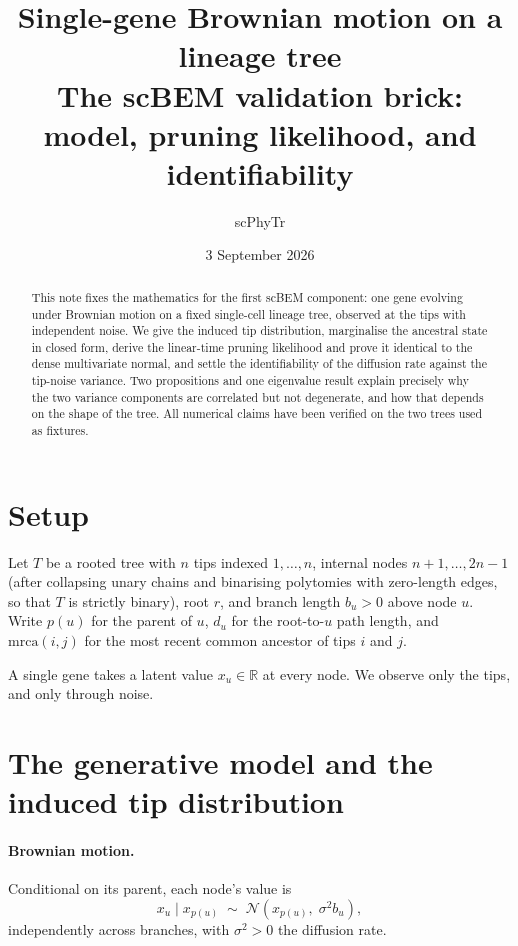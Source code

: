 \documentclass[11pt]{article}
\title{Single-gene Brownian motion on a lineage tree\\
\large The scBEM validation brick: model, pruning likelihood, and identifiability}
\author{scPhyTr}
\date{3 September 2026}
\theoremstyle{remark}
\newcommand{\Norm}{\mathcal{N}}
\newcommand{\Rb}{\mathbb{R}}
\begin{document}
\maketitle

\begin{abstract}
This note fixes the mathematics for the first scBEM component: one gene evolving under Brownian
motion on a fixed single-cell lineage tree, observed at the tips with independent noise. We give the
induced tip distribution, marginalise the ancestral state in closed form, derive the linear-time
pruning likelihood and prove it identical to the dense multivariate normal, and settle the
identifiability of the diffusion rate against the tip-noise variance. Two propositions and one
eigenvalue result explain precisely why the two variance components are correlated but not
degenerate, and how that depends on the shape of the tree. All numerical claims have been verified
on the two trees used as fixtures.
\end{abstract}

\section{Setup}

Let $T$ be a rooted tree with $n$ tips indexed $1,\dots,n$, internal nodes $n{+}1,\dots,2n{-}1$
(after collapsing unary chains and binarising polytomies with zero-length edges, so that $T$ is
strictly binary), root $r$, and branch length $b_u > 0$ above node $u$. Write $p(u)$ for the parent
of $u$, $d_u$ for the root-to-$u$ path length, and $\mathrm{mrca}(i,j)$ for the most recent common
ancestor of tips $i$ and $j$.

A single gene takes a latent value $x_u \in \Rb$ at every node. We observe only the tips, and only
through noise.

\section{The generative model and the induced tip distribution}

\paragraph{Brownian motion.} Conditional on its parent, each node's value is
\begin{equation}
  x_u \mid x_{p(u)} \;\sim\; \Norm\!\left(x_{p(u)},\; \sigma^2 b_u\right),
  \label{eq:bm}
\end{equation}
independently across branches, with $\sigma^2 > 0$ the diffusion rate.
\end{document}
